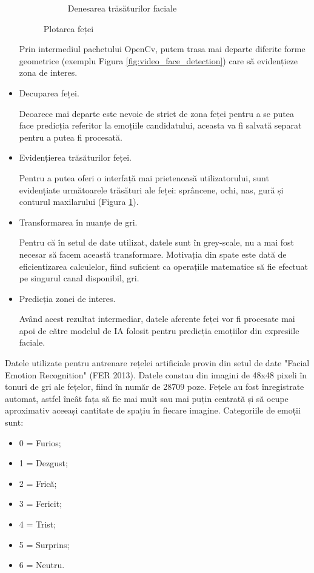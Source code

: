 \documentclass[a4paper, 12pt]{report}
\begin{document}
\begin{itemize}
\begin{figure}[H]
\begin{subfigure}[b]{0.425\textwidth}
				\caption{Denesarea trăsăturilor faciale}
				\label{fig:video_face_features}
			\end{subfigure}
			\caption{Plotarea feței}
			\label{fig:face}
		\end{figure}
	
		Prin intermediul pachetului OpenCv, putem trasa mai departe diferite forme geometrice (exemplu Figura \ref{fig:video_face_detection}) care să evidențieze zona de interes.
		
		\item Decuparea feței.
		
		Deoarece mai departe este nevoie de strict de zona feței pentru a se putea face predicția referitor la emoțiile candidatului, aceasta va fi salvată separat pentru a putea fi procesată. 
		
		\item Evidențierea trăsăturilor feței.
		
		Pentru a putea oferi o interfață mai prietenoasă utilizatorului, sunt evidențiate următoarele trăsături ale feței: sprâncene, ochi, nas, gură și conturul maxilarului (Figura \ref{fig:video_face_features}). 
		
		\item Transformarea în nuanțe de gri.
		
		Pentru că în setul de date utilizat, datele sunt în grey-scale, nu a mai fost necesar să facem această transformare. Motivația din spate este dată de eficientizarea calculelor, fiind suficient ca operațiile matematice să fie efectuat pe singurul canal disponibil, gri.
		
		\item Predicția zonei de interes.
		
		Având acest rezultat intermediar, datele aferente feței vor fi procesate mai apoi de către modelul de IA folosit pentru predicția emoțiilor din expresiile faciale.
		
	\end{itemize}
	
	Datele utilizate pentru antrenare rețelei artificiale provin din setul de date "Facial Emotion Recognition" (FER 2013). Datele constau din imagini de 48x48 pixeli în tonuri de gri ale fețelor, fiind în număr de 28709 poze. Fețele au fost înregistrate automat, astfel încât fața să fie mai mult sau mai puțin centrată și să ocupe aproximativ aceeași cantitate de spațiu în fiecare imagine. Categoriile de emoții sunt: 
	
	\begin{itemize}
		\item 0 = Furios;
		\item 1 = Dezgust;
		\item 2 = Frică;
		\item 3 = Fericit;
		\item 4 = Trist;
		\item 5 = Surprins;
		\item 6 = Neutru.
	\end{itemize}
	
\end{document}
